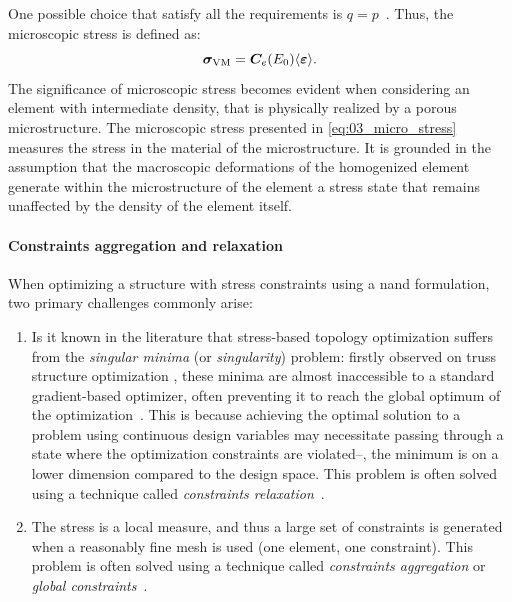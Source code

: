One possible choice that satisfy all the requirements is $q=p$~. Thus, the microscopic stress is defined as:
\begin{equation}
    \bm{\sigma}_{\text{VM}} = \bm{C}_e(E_0)\langle \bm{\varepsilon} \rangle.
    \label{eq:03_micro_stress}
\end{equation}
The significance of microscopic stress becomes evident when considering an element with intermediate density, that is physically realized by a porous microstructure. The microscopic stress presented in \eqref{eq:03_micro_stress} measures the stress in the material of the microstructure. It is grounded in the assumption that the macroscopic deformations of the homogenized element generate within the microstructure of the element a stress state that remains unaffected by the density of the element itself.

\paragraph{Constraints aggregation and relaxation}
When optimizing a structure with stress constraints using a \gls{nand} formulation, two primary challenges commonly arise:
\begin{enumerate}[label=(\roman*)]
    \item Is it known in the literature  that stress-based topology optimization suffers from the \textit{singular minima} (or \textit{singularity}) problem: firstly observed on truss structure optimization , these minima are almost inaccessible to a standard gradient-based optimizer, often preventing it to reach the global optimum of the optimization~\cite{rozvany_design-dependent_2001}. This is because achieving the optimal solution to a problem using continuous design variables may necessitate passing through a state where the optimization constraints are violated--\ie, the minimum is on a lower dimension compared to the design space. This problem is often solved using a technique called \textit{constraints relaxation}~.
    \item The stress is a local measure, and thus a large set of constraints is generated when a reasonably fine mesh is used (one element, one constraint). This problem is often solved using a technique called \textit{constraints aggregation} or \textit{global constraints}~.
\end{enumerate} 


